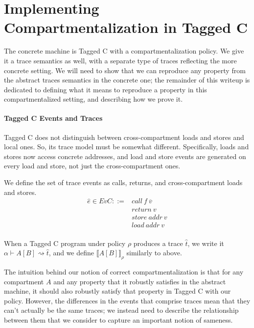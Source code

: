 \documentclass{article}
\begin{document}
\section{Implementing Compartmentalization in Tagged C}

The concrete machine is Tagged C with a compartmentalization policy. We give it a trace semantics
as well, with a separate type of traces reflecting the more concrete setting. We will need to
show that we can reproduce any property from the abstract traces semantics in the concrete one;
the remainder of this writeup is dedicated to defining what it means to reproduce a property
in this compartmentalized setting, and describing how we prove it.

\paragraph{Tagged C Events and Traces}

Tagged C does not distinguish between cross-compartment loads and stores and local ones.
So, its trace model must be somewhat different. Specifically, loads and stores now access
concrete addresses, and load and store events are generated on every load and store, not just the
cross-compartment ones.

We define the set of trace events as calls, returns, and cross-compartment loads and stores.
\[\begin{split}
\hat{e} \in EvC ::= & \mathit{call} ~ f ~ \overline{v} \\
& \mathit{return} ~ v \\
& \mathit{store} ~ \mathit{addr} ~ v \\
& \mathit{load} ~ \mathit{addr} ~ v \\
\end{split}\]

When a Tagged C program under policy \(\rho\) produces a trace \(\hat{t}\), we write it
\(\alpha \vdash A[B] \rightsquigarrow \hat{t}\), and we define \(\llbracket A[B] \rrbracket_\rho\)
similarly to above.

The intuition behind our notion of correct compartmentalization is that for any compartment
\(A\) and any property that it robustly satisfies in the abstract machine, it should also
robustly satisfy that property in Tagged C with our policy. However, the differences in the
events that comprise traces mean that they can't actually be the same traces; we instead
need to describe the relationship between them that we consider to capture an important notion
of sameness.
\end{document}
